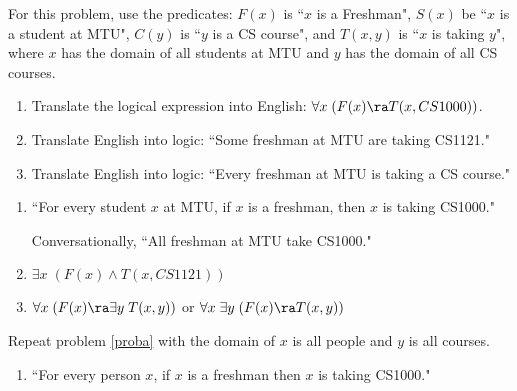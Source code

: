 \begin{questions}
\begin{solution}
  \end{solution}




\label{proba} For this problem, use the predicates: $F(x)$ is ``$x$ is a Freshman", $S(x)$ be ``$x$ is a student at MTU", $C(y)$ is ``$y$ is a CS course", and $T(x,y)$ is ``$x$ is taking $y$", where $x$ has the domain of all students at MTU and $y$ has the domain of all CS courses.
\begin{enumerate}[label=(\alph*),itemsep=0pt,parsep=0pt,
	topsep=0pt,partopsep=0pt]
    \item Translate the logical expression into English: $\forall x\; (F(x) \ra T(x,CS1000))$.
    \item Translate English into logic: ``Some freshman at MTU are taking CS1121."
    \item Translate English into logic: ``Every freshman at MTU is taking a CS course."
\end{enumerate}
    \ifprintanswers
        \vspace{-12pt}
    \fi
\begin{solution}
    \begin{enumerate}[label=(\alph*),itemsep=0pt,parsep=0pt,
    	topsep=0pt,partopsep=0pt]
        \item ``For every student $x$ at MTU, if $x$ is a freshman, then $x$ is taking CS1000."

            Conversationally, ``All freshman at MTU take CS1000."
        \item $\exists x\; (F(x) \wedge T(x,CS 1121))$
        \item $\forall x\; (F(x) \ra \exists y\; T(x,y))$ or $\forall x\; \exists y\; (F(x) \ra T(x,y))$
    \end{enumerate}
\end{solution}


 Repeat problem \ref{proba} with the domain of $x$ is all people and $y$ is all courses.
    \ifprintanswers
        \vspace{-12pt}
    \fi
\begin{solution}
    \begin{enumerate}[label=(\alph*),itemsep=0pt,parsep=0pt,
    	topsep=0pt,partopsep=0pt]
        \item  ``For every person $x$, if $x$ is a freshman then $x$ is taking CS1000."


\end{enumerate}
\end{solution}
\end{questions}

